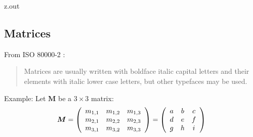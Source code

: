 \MyIO


\begin{VerbatimOut}{z.out}

\subsection{Matrices}

From ISO 80000-2
\cite[page 18]{iso80000-2}:
\begin{quotation}
  Matrices are usually written with boldface italic capital letters
  and their elements with italic lower case letters,
  but other typefaces may be used.
\end{quotation}

Example:
Let \(\bm{M}\) be a \(3 \times 3\) matrix:
\begin{equation*}
  \bm{M}
  =
  \left(
    \begin{array}{ccc}
      m_{1,1}& m_{1,2}& m_{1,3}\\
      m_{2,1}& m_{2,2}& m_{2,3}\\
      m_{3,1}& m_{3,2}& m_{3,3}\\
    \end{array}
  \right)
  =
  \left(
    \begin{array}{ccc}
      a& b& c\\
      d& \mit e& f\\
      g& h& \mit i\\
    \end{array}
  \right)
\end{equation*}
\end{VerbatimOut}

\MyIO


